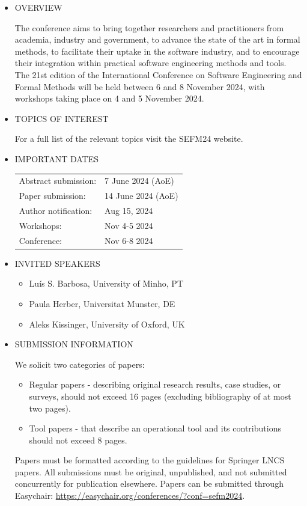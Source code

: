 \documentclass[prodmode,acmtecs]{acmsmall} %
\begin{document}
\begin{itemize}\item  OVERVIEW  
 
  The conference aims to bring together researchers and practitioners from academia, industry and government, to advance the state of the art in formal methods, to facilitate their uptake in the software industry, and to encourage their integration within practical software engineering methods and tools. The 21st edition of the International Conference on Software Engineering and Formal Methods will be held between 6 and 8 November 2024, with workshops taking place on 4 and 5 November 2024. 
 
\item  TOPICS OF INTEREST 
 
  For a full list of the relevant topics visit the SEFM24 website.  
 
\item  IMPORTANT DATES 
 
\begin{tabulary}{\linewidth}{LL}Abstract submission:  & 7 June 2024 (AoE) \\
Paper submission:  & 14 June 2024 (AoE) \\
Author notification:  & Aug 15, 2024 \\
Workshops:  & Nov 4-5 2024 \\
Conference:  & Nov 6-8 2024 \\
\end{tabulary}
 
\item  INVITED SPEAKERS  
 
\begin{itemize}\item  Luís S. Barbosa, University of Minho, PT
\item  Paula Herber, Universitat Munster, DE
\item  Aleks Kissinger, University of Oxford, UK
\end{itemize} 
\item  SUBMISSION INFORMATION 
 
  We solicit two categories of papers: 
 
\begin{itemize}\item  Regular papers - describing original research results, case studies, or surveys, should not exceed 16 pages (excluding bibliography of at most two pages).
\item  Tool papers - that describe an operational tool and its contributions should not exceed 8 pages.
\end{itemize} 
  Papers must be formatted according to the guidelines for Springer LNCS papers. All submissions must be original, unpublished, and not submitted concurrently for publication elsewhere. Papers can be submitted through Easychair: \href{https://easychair.org/conferences/?conf=sefm2024}{https://easychair.org/conferences/?conf=sefm2024}. 
 

\end{itemize}
\end{document}
